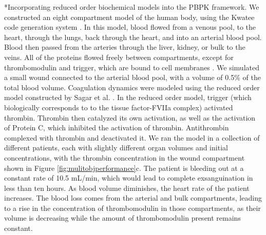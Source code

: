 \documentclass[11pt]{article}
\makeatletter
\renewcommand\paragraph{\@startsection
  {paragraph}{2}{0mm}
  {-0.05in}
  {-0.5\baselineskip}
  {\normalfont\normalsize\itshape}}
\makeatother
\begin{document}
\paragraph*{Incorporating reduced order biochemical models into the PBPK framework.}
We constructed an eight compartment model of the human body, using the Kwatee code generation system \citep{varnerlab_2015_32628}.
In this model, blood flowed from a venous pool, to the heart, through the lungs, back through the heart, and into an arterial blood pool.
Blood then passed from the arteries through the liver, kidney, or bulk to the veins. All of the proteins flowed freely between compartments, except for thrombomodulin and trigger, which are bound to cell membranes \cite{esmon1989roles}. We simulated a small wound connected to the arterial blood pool, with a volume of 0.5\% of the total blood volume. Coagulation dynamics were modeled using the reduced order model constructed by Sagar et al. \cite{sagar2015dynamic}. In the reduced order model, trigger (which biologically corresponds to to the tissue factor-FVIIa complex) activated thrombin. Thrombin then catalyzed its own activation, as well as the activation of Protein C, which inhibited the activation of thrombin. Antithrombin complexed with thrombin and deactivated it. We ran the model in a collection of different patients, each with slightly different organ volumes and initial concentrations, with the thrombin concentration in the wound compartment shown in Figure \ref{fig:mulitobjperformance}c. The patient is bleeding out at a constant rate of 10.5 mL/min, which would lead to complete exsanguination in less than ten hours. As blood volume diminishes, the heart rate of the patient increases.
The blood loss comes from the arterial and bulk compartments, leading to a rise in the concentration of thrombomodulin in those compartments, as their volume is decreasing while the amount of thrombomodulin present remains constant.

\end{document}
